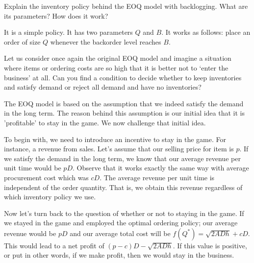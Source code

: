 \begin{exercise}
Explain the inventory policy behind the EOQ model with backlogging. What are its parameters? How does it work?


  \begin{solution}
It is a simple policy. It has two parameters $Q$ and $B$. It works as follows: place an order of size $Q$ whenever the backorder level reaches $B$.
  \end{solution}
\end{exercise}


\begin{exercise}
  Let us consider once again the original EOQ model and imagine a situation where items or ordering
  costs are so high that it is better not to `enter the business' at
  all. Can you find a condition to decide whether to keep inventories
  and satisfy demand or reject all demand and have no inventories?


  \begin{solution}
  
	The EOQ model is based on the assumption that we indeed satisfy the demand in the long term. The reason behind this assumption is our initial idea that it is 'profitable' to stay in the game. We now challenge that initial idea. 
	
	To begin with, we need to introduce an incentive to stay in the game. For instance, a revenue from sales. Let's assume that our selling price for item is $p$. If we satisfy the demand in the long term, we know that our average revenue per unit time would be $pD$. Observe that it works exactly the same way with average procurement cost which was $cD$. The average revenue per unit time is independent of the order quantity. That is, we obtain this revenue regardless of which inventory policy we use. 
	
	Now let's turn back to the question of whether or not to staying in the game. If we stayed in the game and employed the optimal ordering policy; our average revenue would be $pD$ and our average total cost will be $f(Q^*)=\sqrt{2ADh}+cD$. This would lead to a net profit of $(p-c)D-\sqrt{2ADh}$. If this value is positive, or put in other words, if we make profit, then we would stay in the business. 
  \end{solution}
\end{exercise}

